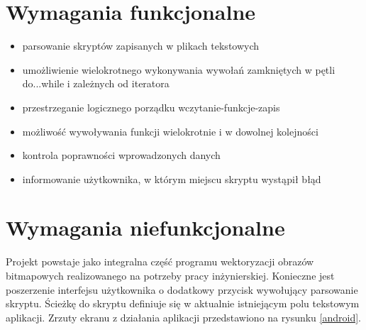 \documentclass[11pt,a4paper]{article}
\begin{document}
\section{Wymagania funkcjonalne}
\begin{itemize}
\item{parsowanie skryptów zapisanych w plikach tekstowych}
\item{umożliwienie wielokrotnego wykonywania wywołań zamkniętych w pętli do...while i zależnych od iteratora}
\item{przestrzeganie logicznego porządku wczytanie-funkcje-zapis}
\item{możliwość wywoływania funkcji wielokrotnie i w dowolnej kolejności}
\item{kontrola poprawności wprowadzonych danych}
\item{informowanie użytkownika, w którym miejscu skryptu wystąpił błąd}
\end{itemize}

\section{Wymagania niefunkcjonalne}
Projekt powstaje jako integralna część programu wektoryzacji obrazów bitmapowych realizowanego na potrzeby pracy inżynierskiej. Konieczne jest poszerzenie interfejsu użytkownika o dodatkowy przycisk wywołujący parsowanie skryptu. Ścieżkę do skryptu definiuje się w aktualnie istniejącym polu tekstowym aplikacji. Zrzuty ekranu z działania aplikacji przedstawiono na rysunku \ref{android}.
\end{document}
